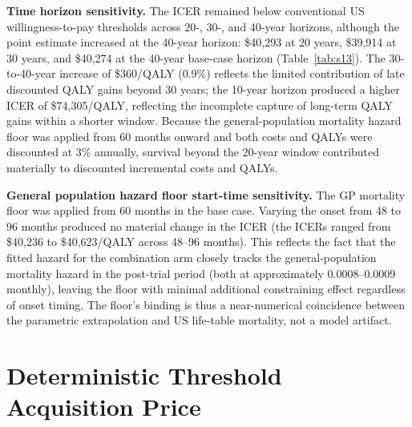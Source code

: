 \documentclass[11pt,a4paper]{article}
\begin{document}
\indent \textbf{Time horizon sensitivity.} The ICER remained below conventional US willingness-to-pay thresholds across 20-, 30-, and 40-year horizons, although the point estimate increased at the 40-year horizon: \$40,293 at 20 years, \$39,914 at 30 years, and \$40,274 at the 40-year base-case horizon (Table~\ref{tab:s13}). The 30-to-40-year increase of \$360/QALY (0.9\%) reflects the limited contribution of late discounted QALY gains beyond 30 years; the 10-year horizon produced a higher ICER of \$74,305/QALY, reflecting the incomplete capture of long-term QALY gains within a shorter window. Because the general-population mortality hazard floor was applied from 60 months onward and both costs and QALYs were discounted at 3\% annually, survival beyond the 20-year window contributed materially to discounted incremental costs and QALYs.

\noindent \textbf{General population hazard floor start-time sensitivity.} The GP mortality floor was applied from 60 months in the base case. Varying the onset from 48 to 96 months produced no material change in the ICER (the ICERs ranged from \$40,236 to \$40,623/QALY across 48--96 months). This reflects the fact that the fitted hazard for the combination arm closely tracks the general-population mortality hazard in the post-trial period (both at approximately 0.0008--0.0009 monthly), leaving the floor with minimal additional constraining effect regardless of onset timing. The floor's binding is thus a near-numerical coincidence between the parametric extrapolation and US life-table mortality, not a model artifact.

\section{Deterministic Threshold Acquisition Price}
\end{document}
